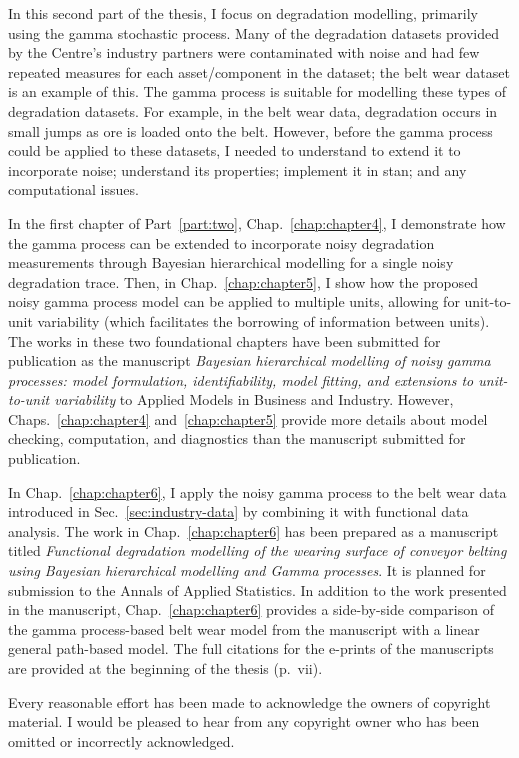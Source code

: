 \documentclass{mammoth}
\begin{document}
In this second part of the thesis, I focus on degradation modelling, primarily using the gamma stochastic process. Many of the degradation datasets provided by the Centre's industry partners were contaminated with noise and had few repeated measures for each asset/component in the dataset; the belt wear dataset is an example of this. The gamma process is suitable for modelling these types of degradation datasets. For example, in the belt wear data, degradation occurs in small jumps as ore is loaded onto the belt. However, before the gamma process could be applied to these datasets, I needed to understand to extend it to incorporate noise; understand its properties; implement it in stan; and any computational issues.

In the first chapter of Part~\ref{part:two}, Chap.~\ref{chap:chapter4}, I demonstrate how the gamma process can be extended to incorporate noisy degradation measurements through Bayesian hierarchical modelling for a single noisy degradation trace. Then, in Chap.~\ref{chap:chapter5}, I show how the proposed noisy gamma process model can be applied to multiple units, allowing for unit-to-unit variability (which facilitates the borrowing of information between units). The works in these two foundational chapters have been submitted for publication as the manuscript \textit{Bayesian hierarchical modelling of noisy gamma processes: model formulation, identifiability, model fitting, and extensions to unit-to-unit variability} to Applied Models in Business and Industry. However, Chaps.~\ref{chap:chapter4} and~\ref{chap:chapter5} provide more details about model checking, computation, and diagnostics than the manuscript submitted for publication.

In Chap.~\ref{chap:chapter6}, I apply the noisy gamma process to the belt wear data introduced in Sec.~\ref{sec:industry-data} by combining it with functional data analysis. The work in Chap.~\ref{chap:chapter6} has been prepared as a manuscript titled \textit{Functional degradation modelling of the wearing surface of conveyor belting using Bayesian hierarchical modelling and Gamma processes}. It is planned for submission to the Annals of Applied Statistics. In addition to the work presented in the manuscript, Chap.~\ref{chap:chapter6} provides a side-by-side comparison of the gamma process-based belt wear model from the manuscript with a linear general path-based model. The full citations for the e-prints of the manuscripts are provided at the beginning of the thesis (p.~vii).






{
    \backmatter
    \printbibliography
    \noindent
    Every reasonable effort has been made to acknowledge the owners of copyright material.
    I would be pleased to hear from any copyright owner who has been omitted or incorrectly acknowledged.
} %


\end{document}
